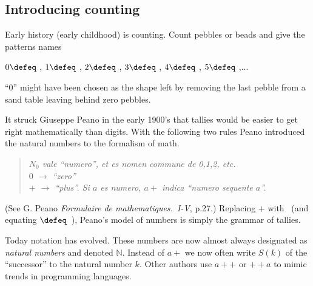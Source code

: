 \subsection{Introducing counting}
Early history (early childhood) is counting.  Count 
pebbles or beads and give the patterns names
\begin{center}
    $0\defeq$ \underline{\hspace{5mm}}, 
    $1\defeq$ \StrokeOne,
    $2\defeq$ \StrokeTwo,
    $3\defeq$ \StrokeThree,
    $4\defeq$ \StrokeFour,
    $5\defeq$ \StrokeFive,...
\end{center}
``0'' might have been chosen as the shape left by removing the last pebble from a sand 
table leaving behind zero pebbles.

It struck Giuseppe Peano in the early 1900's that tallies 
would be easier to get right mathematically than digits. With the following two rules
Peano introduced the natural numbers to the formalism of math.
\begin{quote}
    \textit{
    $N_0$ vale ``numero'', et es nomen commune de 0,1,2, etc.\\
    $0$ $\to$  ``zero''\\
    $+$ $\to$ ``plus''.  Si $a$ es numero, $a+$ indica ``numero sequente $a$''.
    }
\end{quote}
(See G. Peano \emph{Formulaire de mathematiques.~I-V}, p.27.)
Replacing $+$ with \StrokeOne ~(and equating \StrokeFive$\defeq$\StrokeFour~\StrokeOne),
Peano's model of numbers is simply the grammar of tallies.

Today notation has evolved.  These numbers are now almost always designated as
\emph{natural numbers} and denoted $\mathbb{N}$.  Instead of $a+$ we now 
often write $S(k)$ of the ``successor'' to the natural number $k$.  Other 
authors use $a++$ or $++a$ to mimic trends in programming languages.  

